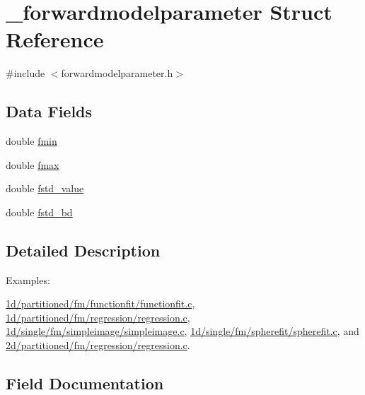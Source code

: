 \hypertarget{struct__forwardmodelparameter}{}\section{\+\_\+forwardmodelparameter Struct Reference}
\label{struct__forwardmodelparameter}


{\ttfamily \#include $<$forwardmodelparameter.\+h$>$}

\subsection*{Data Fields}
\begin{DoxyCompactItemize}
\item 
double \hyperlink{struct__forwardmodelparameter_aced3d685a9701e3488ac78093a4e4733}{fmin}
\item 
double \hyperlink{struct__forwardmodelparameter_aa028b68fc0f738b4d578e90751ffaa24}{fmax}
\item 
double \hyperlink{struct__forwardmodelparameter_a08b65584a090a79dce5dc91aaced7bbe}{fstd\+\_\+value}
\item 
double \hyperlink{struct__forwardmodelparameter_a7afd8319a9bf822ab7999ea8a52be0ed}{fstd\+\_\+bd}
\end{DoxyCompactItemize}


\subsection{Detailed Description}
\begin{Desc}
\item[Examples\+: ]\par
\hyperlink{1d_2partitioned_2fm_2functionfit_2functionfit_8c-example}{1d/partitioned/fm/functionfit/functionfit.\+c}, \hyperlink{1d_2partitioned_2fm_2regression_2regression_8c-example}{1d/partitioned/fm/regression/regression.\+c}, \hyperlink{1d_2single_2fm_2simpleimage_2simpleimage_8c-example}{1d/single/fm/simpleimage/simpleimage.\+c}, \hyperlink{1d_2single_2fm_2spherefit_2spherefit_8c-example}{1d/single/fm/spherefit/spherefit.\+c}, and \hyperlink{2d_2partitioned_2fm_2regression_2regression_8c-example}{2d/partitioned/fm/regression/regression.\+c}.\end{Desc}


\subsection{Field Documentation}
